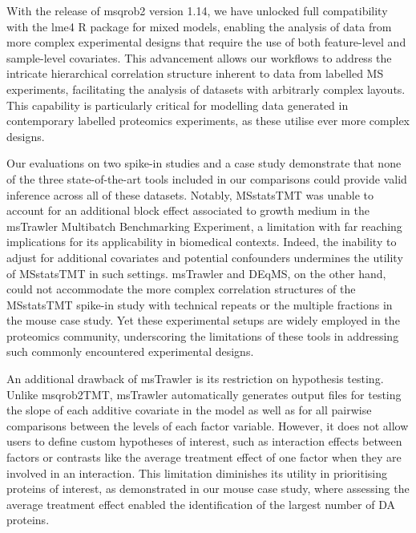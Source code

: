 \documentclass[
  letterpaper,
  DIV=11,
  numbers=noendperiod]{scrartcl}
\begin{document}
With the release of msqrob2 version 1.14, we have unlocked full
compatibility with the lme4 R package for mixed models, enabling the
analysis of data from more complex experimental designs that require the
use of both feature-level and sample-level covariates. This advancement
allows our workflows to address the intricate hierarchical correlation
structure inherent to data from labelled MS experiments, facilitating
the analysis of datasets with arbitrarly complex layouts. This
capability is particularly critical for modelling data generated in
contemporary labelled proteomics experiments, as these utilise ever more
complex designs.

Our evaluations on two spike-in studies and a case study demonstrate
that none of the three state-of-the-art tools included in our
comparisons could provide valid inference across all of these datasets.
Notably, MSstatsTMT was unable to account for an additional block effect
associated to growth medium in the msTrawler Multibatch Benchmarking
Experiment, a limitation with far reaching implications for its
applicability in biomedical contexts. Indeed, the inability to adjust
for additional covariates and potential confounders undermines the
utility of MSstatsTMT in such settings. msTrawler and DEqMS, on the
other hand, could not accommodate the more complex correlation
structures of the MSstatsTMT spike-in study with technical repeats or
the multiple fractions in the mouse case study. Yet these experimental
setups are widely employed in the proteomics community, underscoring the
limitations of these tools in addressing such commonly encountered
experimental designs.

An additional drawback of msTrawler is its restriction on hypothesis
testing. Unlike msqrob2TMT, msTrawler automatically generates output
files for testing the slope of each additive covariate in the model as
well as for all pairwise comparisons between the levels of each factor
variable. However, it does not allow users to define custom hypotheses
of interest, such as interaction effects between factors or contrasts
like the average treatment effect of one factor when they are involved
in an interaction. This limitation diminishes its utility in
prioritising proteins of interest, as demonstrated in our mouse case
study, where assessing the average treatment effect enabled the
identification of the largest number of DA proteins.
\end{document}
